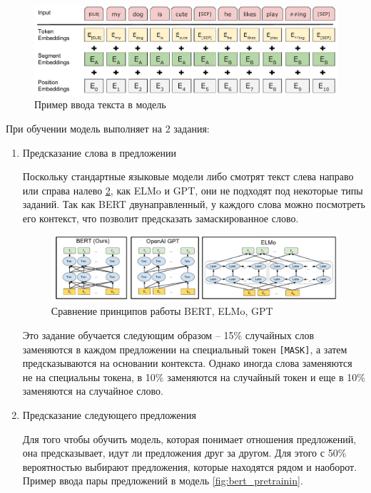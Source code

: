 \documentclass[PI, VKR]{HSEUniversity}
\begin{document}
\begin{figure}[h]
\centering
\includegraphics[width=.9\linewidth]{img/Input_Emebeddings.pdf}
\caption{\label{fig:inputemebeddings}Пример ввода текста в модель}
\end{figure}

При обучении модель выполняет на 2 задания:
\begin{enumerate}
\item Предсказание слова в предложении

Поскольку стандартные языковые модели либо смотрят текст слева направо или справа налево \ref{fig:BERT_comparisons}, как ELMo\autocite{peters_deep_2018} и GPT\autocite{radford_language_2019}, они не подходят под некоторые типы заданий. Так как BERT двунаправленный, у каждого слова можно посмотреть его контекст, что позволит предсказать замаскированное слово.

\begin{figure}[h]
\centering
\includegraphics[width=.9\linewidth]{img/BERT_comparisons.pdf}
\caption{\label{fig:BERT_comparisons}Сравнение принципов работы BERT, ELMo, GPT}
\end{figure}

Это задание обучается следующим образом -- 15\% случайных слов заменяются в каждом предложении на специальный токен \texttt{[MASK]}, а затем предсказываются на основании контекста. Однако иногда слова заменяются не на специальны токена, в 10\% заменяются на случайный токен и еще в 10\% заменяются на случайное слово.

\item Предсказание следующего предложения

Для того чтобы обучить модель, которая понимает отношения предложений, она предсказывает, идут ли предложения друг за другом. Для этого с 50\% вероятностью выбирают предложения, которые находятся рядом и наоборот. Пример ввода пары предложений в модель \ref{fig:bert_pretrainin}.


\end{enumerate}
\end{document}
